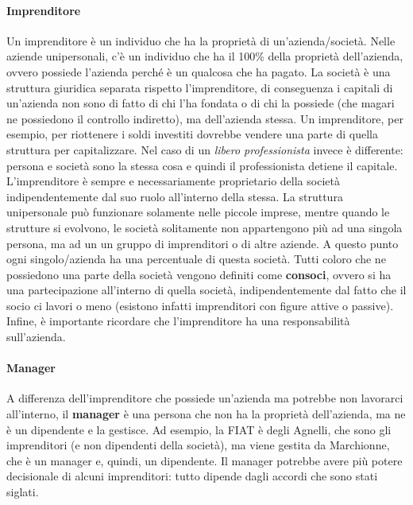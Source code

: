 \paragraph*{Imprenditore} Un imprenditore è un individuo che ha la
proprietà di un'azienda/società. Nelle aziende unipersonali, c'è un individuo
che ha il 100\% della proprietà dell'azienda, ovvero possiede l'azienda perché
è un qualcosa che ha pagato. La società è una struttura giuridica separata
rispetto l'imprenditore, di conseguenza i capitali di un'azienda non sono di
fatto di chi l'ha fondata o di chi la possiede (che magari ne possiedono il
controllo indiretto), ma dell'azienda stessa. Un imprenditore, per esempio, per
riottenere i soldi investiti dovrebbe vendere una parte di quella struttura per
capitalizzare. Nel caso di un \textit{libero professionista} invece è
differente: persona e società sono la stessa cosa e quindi il professionista
detiene il capitale. L'imprenditore è sempre e necessariamente proprietario
della società indipendentemente dal suo ruolo all'interno della stessa.
La struttura unipersonale può funzionare solamente nelle piccole imprese,
mentre quando le strutture si evolvono, le società solitamente non appartengono
più ad una singola persona, ma ad un un gruppo di imprenditori o di altre
aziende. A questo punto ogni singolo/azienda ha una percentuale di questa
società. Tutti coloro che ne possiedono una parte della società vengono
definiti come \textbf{consoci}, ovvero si ha una partecipazione all'interno di
quella società, indipendentemente dal fatto che il socio ci lavori o meno
(esistono infatti imprenditori con figure attive o passive). Infine, è
importante ricordare che l'imprenditore ha una responsabilità sull'azienda.

\paragraph*{Manager} A differenza dell'imprenditore che possiede un'azienda ma
potrebbe non lavorarci all'interno, il \textbf{manager} è una persona che non ha
la proprietà dell'azienda, ma ne è un dipendente e la gestisce.
Ad esempio, la FIAT è degli Agnelli, che sono gli imprenditori (e non
dipendenti della società), ma viene gestita da Marchionne, che è un manager e,
quindi, un dipendente. Il manager potrebbe avere più potere decisionale di 
alcuni imprenditori: tutto dipende dagli accordi che sono stati siglati.

